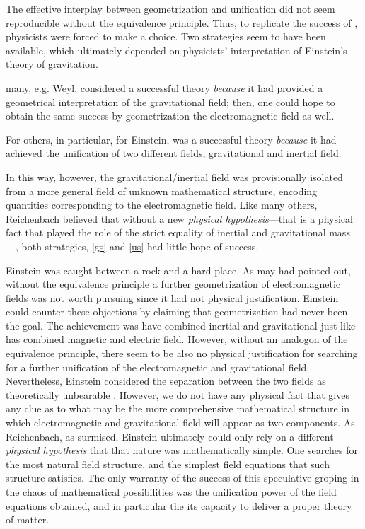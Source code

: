 \documentclass[draft]{article}
\begin{document}
The effective interplay between geometrization and unification did not seem reproducible without the equivalence principle. Thus, to replicate the success of \gr, physicists were forced to make a choice. Two strategies seem to have been available, which ultimately depended on physicists' interpretation of Einstein's theory of gravitation. \begin{inparaenum}[(a)] \item \label{gs} many, e.g. Weyl, considered \gr a successful theory \emph{because} it had provided a geometrical interpretation of the gravitational field; then, one could hope to obtain the same success by geometrization the electromagnetic field as well. \item \label{us} For others, in particular, for Einstein, \gr was a successful theory \emph{because} it had achieved the unification of two different fields, gravitational and inertial field. \end{inparaenum} In this way, however, the gravitational/inertial field was provisionally isolated from a more general field of unknown mathematical structure, encoding quantities corresponding to the electromagnetic field. Like many others, Reichenbach believed that without a new \emph{physical hypothesis}---that is a physical fact that played the role of the strict equality of inertial and gravitational mass---, both strategies, \cref{gs} and \cref{us} had little hope of success.

Einstein was caught between a rock and a hard place. As may had pointed out, without the equivalence principle a further geometrization of electromagnetic fields was not worth pursuing since it had not physical justification. Einstein could counter these objections by claiming that geometrization had never been the goal. The achievement \gr was have combined inertial and gravitational just like \sr has combined magnetic and electric field. However, without an analogon of the equivalence principle, there seem to be also no physical justification for searching for a further unification of the electromagnetic and gravitational field. Nevertheless, Einstein considered the separation between the two fields as theoretically unbearable \citep[24]{Einstein1930i}. However, we do not have any physical fact that gives any clue as to what may be the more comprehensive mathematical structure in which electromagnetic and gravitational field will appear as two components. As Reichenbach, as surmised, Einstein ultimately could only rely on a different \emph{physical hypothesis} that that nature was mathematically simple. One searches for the most natural field structure, and the simplest field equations that such structure satisfies. The only warranty of the success of this speculative groping in the chaos of mathematical possibilities was the unification power of the field equations obtained, and in particular the its capacity to deliver a proper theory of matter.
\end{document}
